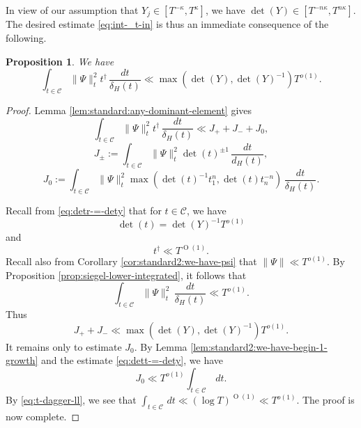 \documentclass[reqno]{amsart}
\def\O{\operatorname{O}}
\theoremstyle{plain} \newtheorem{theorem} {Theorem}
\newtheorem{proposition} [theorem] {Proposition}
\theoremstyle{definition} \newtheorem{definition} [theorem] {Definition}
\theoremstyle{itplain} %
\numberwithin{equation}{section}
\numberwithin{theorem}{section}
\begin{document}
In view of our assumption that $Y_j \in [T^{-\kappa}, T^{\kappa}]$, we have $\det(Y) \in [T^{- n \kappa}, T^{n \kappa}]$.  The desired estimate \eqref{eq:int-_t-in} is thus an immediate consequence of the following.
\begin{proposition}
  We have
  \begin{equation*}
    \int _{t \in \mathcal{C} } \|\Psi\|_t^2 t ^\dagger \, \frac{d t}{\delta_H(t)}
    \ll
    \max(\det(Y), \det(Y)^{-1}) T^{o(1)}.
  \end{equation*}
\end{proposition}
\begin{proof}
  Lemma \ref{lem:standard:any-dominant-element} gives
  \begin{equation*}
    \int _{t \in \mathcal{C} } \|\Psi\|_t^2 t ^\dagger \, \frac{d t}{\delta_H(t)} \ll
    J_+ + J_- + J_0,
  \end{equation*}
\begin{equation*}
  J_{\pm} := \int _{t \in \mathcal{C} } \|\Psi\|_t^2 \det(t)^{\pm 1} \, \frac{d t}{d_H(t)},
\end{equation*}
\begin{equation*}
  J_0 := \int _{t \in \mathcal{C} } \|\Psi\|_t^2 \max(\det(t)^{-1} t_1^n, \det(t) t_n^{-n}) \, \frac{d t}{ \delta_H(t) }.
\end{equation*}

Recall from \eqref{eq:detr-=-dety} that for $t \in \mathcal{C}$, we have
\begin{equation}\label{eq:dett-=-dety}
\det(t) = \det(Y)^{-1} T^{o(1)}
\end{equation}
and
\begin{equation}\label{eq:t-dagger-ll}
t ^\dagger \ll T^{\O(1)}.
\end{equation}
Recall also from Corollary \ref{cor:standard2:we-have-psi}  that $\|\Psi\| \ll T^{o(1)}$.  By Proposition \ref{prop:siegel-lower-integrated}, it follows that
\begin{equation*}
  \int _{t \in \mathcal{C} } \|\Psi\|_t^2 \, \frac{d t}{ \delta_H(t) } \ll T^{o(1)}.
\end{equation*}
Thus
\begin{equation*}
  J_+ + J _- \ll
  \max(\det(Y), \det(Y)^{-1}) T^{o(1)}.
\end{equation*}
It remains only to estimate $J_0$.  By Lemma \ref{lem:standard2:we-have-begin-1-growth} and the estimate \eqref{eq:dett-=-dety}, we have
\begin{equation*}
  J_0 \ll T^{o(1)} \int_{t \in \mathcal{C}} \, d t.
\end{equation*}
By \eqref{eq:t-dagger-ll}, we see that $\int_{t \in \mathcal{C}} \, d t \ll (\log T)^{\O(1)} \ll T^{o(1)}$.  The proof is now complete.
\end{proof}
\end{document}
